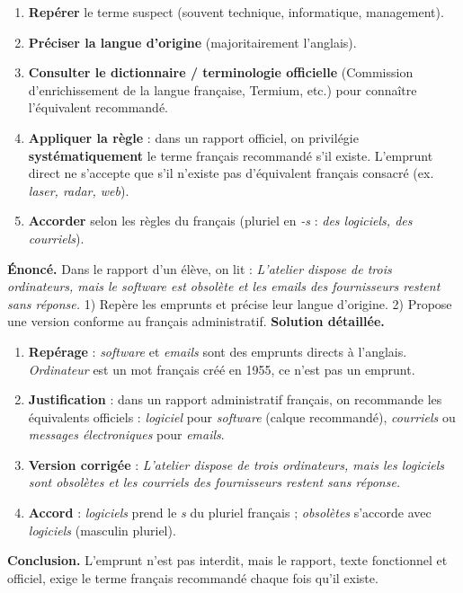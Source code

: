 \documentclass[11pt]{article}
\begin{document}
\begin{methode}
\begin{enumerate}
\item \textbf{Repérer} le terme suspect (souvent technique, informatique, management).
\item \textbf{Préciser la langue d'origine} (majoritairement l'anglais).
\item \textbf{Consulter le dictionnaire / terminologie officielle} (Commission d'enrichissement de la langue française, Termium, etc.) pour connaître l'équivalent recommandé.
\item \textbf{Appliquer la règle} : dans un rapport officiel, on privilégie \textbf{systématiquement} le terme français recommandé s'il existe. L'emprunt direct ne s'accepte que s'il n'existe pas d'équivalent français consacré (ex. \emph{laser, radar, web}).
\item \textbf{Accorder} selon les règles du français (pluriel en \emph{-s} : \emph{des logiciels, des courriels}).
\end{enumerate}
\end{methode}

\begin{exoresolu}
\textbf{Énoncé.} Dans le rapport d'un élève, on lit : \emph{L'atelier dispose de trois ordinateurs, mais le software est obsolète et les emails des fournisseurs restent sans réponse.} 1) Repère les emprunts et précise leur langue d'origine. 2) Propose une version conforme au français administratif.
\tcblower
\textbf{Solution détaillée.}
\begin{enumerate}
\item \textbf{Repérage} : \emph{software} et \emph{emails} sont des emprunts directs à l'anglais. \emph{Ordinateur} est un mot français créé en 1955, ce n'est pas un emprunt.
\item \textbf{Justification} : dans un rapport administratif français, on recommande les équivalents officiels : \emph{logiciel} pour \emph{software} (calque recommandé), \emph{courriels} ou \emph{messages électroniques} pour \emph{emails}.
\item \textbf{Version corrigée} : \emph{L'atelier dispose de trois ordinateurs, mais les logiciels sont obsolètes et les courriels des fournisseurs restent sans réponse.}
\item \textbf{Accord} : \emph{logiciels} prend le \emph{s} du pluriel français ; \emph{obsolètes} s'accorde avec \emph{logiciels} (masculin pluriel).
\end{enumerate}
\textbf{Conclusion.} L'emprunt n'est pas interdit, mais le rapport, texte fonctionnel et officiel, exige le terme français recommandé chaque fois qu'il existe.
\end{exoresolu}
\end{document}
